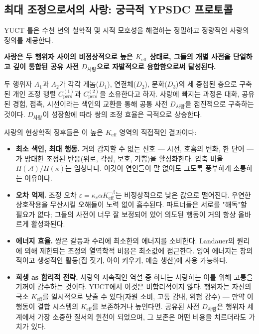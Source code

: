 \documentclass[12pt,a4paper]{article}
\begin{document}
	\subsection{최대 조정으로서의 사랑: 궁극적 YPSDC 프로토콜}
	
	YUCT 틀은 수천 년의 철학적 및 시적 모호성을 해결하는 정밀하고 정량적인 사랑의 정의를 제공한다.
	
	\textbf{사랑은 두 행위자 사이의 비정상적으로 높은 \(K_{\mathrm{eff}}\) 상태로, 그들의 개별 사전을 단일하고 깊이 통합된 공유 사전 \(D_{\text{사랑}}\)으로 자발적으로 융합함으로써 달성된다.}
	
	두 행위자 \(A_1\)과 \(A_2\)가 각각 게놈(\(D_1\)), 연결체(\(D_2\)), 문화(\(D_3\))의 세 중첩된 층으로 구축된 개인 조정 행렬 \(C_{\text{pers}}^{(1)}\)과 \(C_{\text{pers}}^{(2)}\)을 소유한다고 하자. 사랑에 빠지는 과정은 대화, 공유된 경험, 접촉, 시선이라는 색인의 교환을 통해 공통 사전 \(D_{\text{사랑}}\)을 점진적으로 구축하는 것이다. \(D_{\text{사랑}}\)이 성장함에 따라 쌍의 조정 효율은 극적으로 상승한다.
	
	사랑의 현상학적 징후들은 이 높은 \(K_{\mathrm{eff}}\) 영역의 직접적인 결과이다:
	
	\begin{itemize}[leftmargin=*]
		\item \textbf{최소 색인, 최대 행동.} 거의 감지할 수 없는 신호 — 시선, 호흡의 변화, 한 단어 — 가 방대한 조정된 반응(위로, 각성, 보호, 기쁨)을 활성화한다. 압축 비율 \(H(\mathcal{A}) / H(\kappa)\)는 엄청나다. 이것이 연인들이 말 없이도 그토록 풍부하게 소통하는 이유이다.
		\item \textbf{오차 억제.} 조정 오차 \(\varepsilon = \kappa_c \alpha K_{\mathrm{eff}}^{-\beta}\)는 비정상적으로 낮은 값으로 떨어진다. 우연한 상호작용을 무산시킬 오해들이 노력 없이 흡수된다. 파트너들은 서로를 "해독"할 필요가 없다; 그들의 사전이 너무 잘 보정되어 있어 의도된 행동이 거의 항상 올바르게 활성화된다.
		\item \textbf{에너지 효율.} 쌍은 갈등과 수리에 최소한의 에너지를 소비한다. Landauer의 원리에 의해 제한되는 조정의 열역학적 비용은 최소값에 접근한다. 잉여 에너지는 창의적이고 생성적인 활동(집 짓기, 아이 키우기, 예술 생산)에 사용 가능하다.
		\item \textbf{희생 as 합리적 전략.} 사랑의 지속적인 역설 중 하나는 사랑하는 이를 위해 고통을 기꺼이 감수하는 것이다. YUCT에서 이것은 비합리적이지 않다. 행위자는 자신의 국소 \(K_{\mathrm{eff}}\)를 일시적으로 낮출 수 있다(자원 소비, 고통 감내, 위험 감수) — 만약 이 행동이 결합 시스템의 \(K_{\mathrm{eff}}\)를 보존하거나 높인다면. 공유된 사전 \(D_{\text{사랑}}\)은 행위자 세계에서 가장 소중한 질서의 원천이 되었으며, 그 보존은 어떤 비용을 치르더라도 가치가 있다.
	\end{itemize}
	
\end{document}
